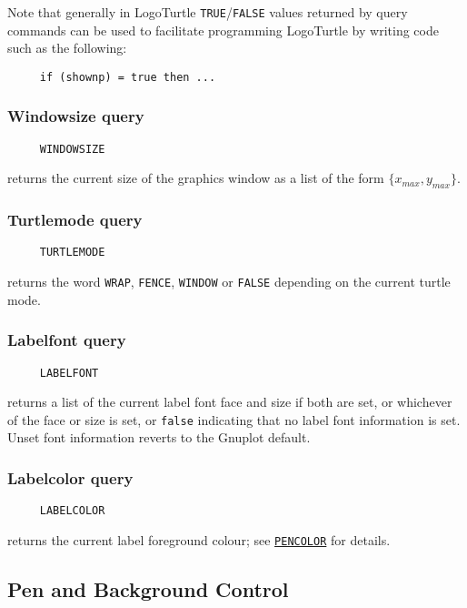 Note that generally in LogoTurtle \texttt{TRUE}/\texttt{FALSE} values
returned by query commands can be used to facilitate programming
LogoTurtle by writing code such as the following:
\begin{verbatim}
     if (shownp) = true then ...
\end{verbatim}

\subsubsection*{Windowsize query}
\begin{verbatim}
     WINDOWSIZE
\end{verbatim}
returns the current size of the graphics window as a list of the form
$\{x_{max},y_{max}\}$.

\subsubsection*{Turtlemode query}
\begin{verbatim}
     TURTLEMODE
\end{verbatim}
returns the word \texttt{WRAP}, \texttt{FENCE}, \texttt{WINDOW} or
\texttt{FALSE} depending on the current turtle mode.

\subsubsection*{Labelfont query}
\begin{verbatim}
     LABELFONT
\end{verbatim}
\label{logoturtle:labelfont}
returns a list of the current label font face and size if both are
set, or whichever of the face or size is set, or \texttt{false}
indicating that no label font information is set.  Unset font
information reverts to the Gnuplot default.

\subsubsection*{Labelcolor query}
\begin{verbatim}
     LABELCOLOR
\end{verbatim}
returns the current label foreground colour; see
\hyperref[logoturtle:pencolor]{\texttt{PENCOLOR}} for details.


\subsection{Pen and Background Control}
\label{logoturtle:PBC}

